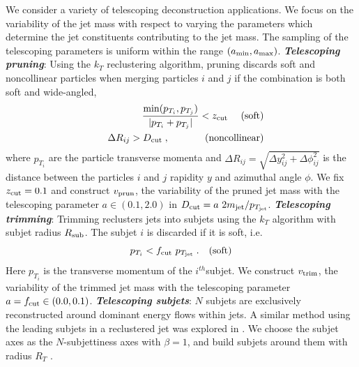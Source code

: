 \documentclass[aps,prl,floatfix,preprintnumbers,twocolumn,groupedaddress,nofootinbib]{revtex4-1}
\newcommand{\be}{\begin{equation}}
\newcommand{\ee}{\end{equation}}
\newcommand{\bea}{\begin{eqnarray}}
\newcommand{\eea}{\end{eqnarray}}
\begin{document}
We consider a variety of telescoping deconstruction applications. We focus on the variability of the jet mass with respect to varying the parameters which determine the jet constituents contributing to the jet mass. %
The sampling of the telescoping parameters is uniform within the range $(a_{\rm min},a_{\rm max})$. %
\newline
\newline
\noindent \textit{\textbf{Telescoping pruning}}: Using the $k_T$ reclustering algorithm, pruning discards soft and noncollinear particles when %
merging particles $i$ and $j$ if the combination is both soft and wide-angled,
\bea
    &&\frac{{\rm min}(p_{T_i},p_{T_j})}{|p_{T_i}+p_{T_j}|}<z_{\rm cut}~~~~{\rm (soft)}\nonumber\\
    &&\Delta R_{ij} > D_{\rm cut}\;,~~~~~~~~~~~{\rm (noncollinear)}
\eea
where $p_{T_i}$ are the particle transverse momenta and $\Delta R_{ij}=\sqrt{\Delta y_{ij}^2+\Delta \phi_{ij}^2}$ is the distance between the particles $i$ and $j$ rapidity $y$ and azimuthal angle $\phi$. We fix $z_{\rm cut}=0.1$ and construct $v_{\rm prun}$, the variability of the pruned jet mass with the telescoping parameter $a\in (0.1, 2.0)$ in $D_{\rm cut} = a~ 2m_{\rm jet}/p_{T_{\rm jet}}$. %
\newline
\newline
\noindent \textit{\textbf{Telescoping trimming}}: Trimming \cite{Krohn:2009th} reclusters jets into subjets using the $k_T$ algorithm with subjet radius $R_{\rm sub}$. The subjet $i$ is discarded if it is soft, i.e. %
\be
    p_{T_i} < f_{\rm cut}~p_{T_{\rm jet}}\;.~~~{\rm (soft)}
\ee
Here $p_{T_i}$ is the transverse momentum of the $i^{th}$subjet. We construct $v_{\rm trim}$, the variability of the trimmed jet mass with the telescoping parameter $a = f_{\rm cut} \in (0.0, 0.1)$. %
\newline
\newline
\noindent \textit{\textbf{Telescoping subjets}}: $N$ subjets are exclusively reconstructed around %
dominant energy flows within jets. A similar method using the leading subjets in a reclustered jet was explored in \cite{Cui:2010km}. We choose the subjet axes as the $N$-subjettiness axes \cite{Thaler:2010tr} with $\beta = 1$, and build subjets around them with radius $R_T$ \cite{Stewart:2010tn,Chien:2013kca,Stewart:2015waa,Thaler:2015xaa}. %
\end{document}
